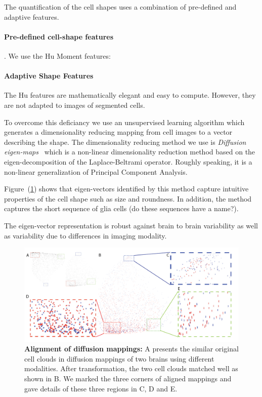 \documentclass[11pt]{article}
\begin{document}
The quantification of the cell shapes uses a  combination of
pre-defined and adaptive features. 

\paragraph{Pre-defined cell-shape features}.
We use the Hu Moment features:

\paragraph{Adaptive Shape Features}
The Hu features are mathematically elegant and easy to
compute. However, they are not adapted to images of segmented cells.

To overcome this deficiancy we use an unsupervised learning algorithm
which generates a dimensionality reducing mapping from cell images to
a vector describing the shape. The dimensionality reducing method we
use is {\em Diffusion
  eigen-maps}~\cite{belkin2003,coifman2005geometric} which is a
non-linear dimensionality reduction method based on the eigen-decomposition
of the Laplace-Beltrami operator. Roughly speaking, it is a non-linear
generalization of Principal Component Analysis.

Figure~(\ref{fig:eigenmap}) shows that eigen-vectors identified by this method capture intuitive
properties of the cell shape such as size and roundness. In addition,
the method captures the short sequence  of glia cells (do these sequences
have a name?).

The eigen-vector representation is robust against brain to brain
variability as well as variability due to differences in imaging
modality.

\begin{figure}[t]
  \includegraphics[width=\textwidth]{figures/Diffusionmap.png}
  \caption{\label{fig:eigenmap}{\bf Alignment of diffusion mappings:} A presents the
    similar original cell clouds in diffusion mappings of two brains
    using different modalities. After transformation, the two cell
    clouds matched well as shown in B. We marked the three corners of
    aligned mappings and gave details of these three regions in C, D
    and E.  }
\end{figure}
\end{document}
